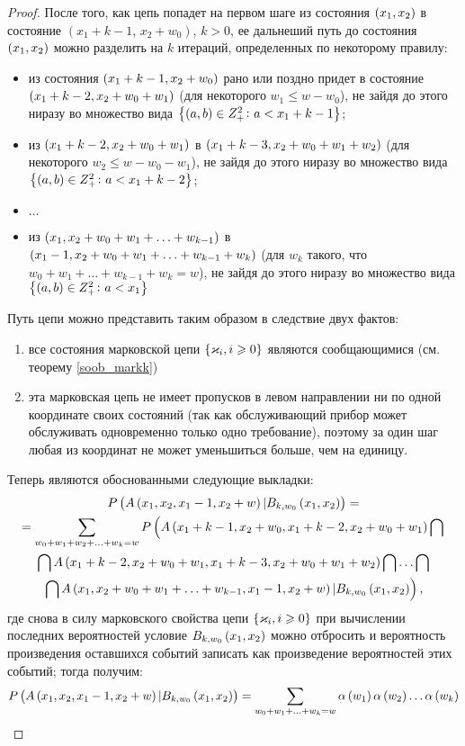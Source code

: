 \documentclass[a4paper,14pt,russian]{article}
\newcommand{\Markk}[0]{\brrr{ \vk_i, i \geqslant 0}}
\begin{document}
\begin{proof}
После того, как цепь попадет на первом шаге из состояния $\left(x_1,x_2\right)$  в состояние
$\left( x_1 + k - 1\right.$, $\left. x_2 + w_0\right)$, $k > 0$, ее дальнеший путь до состояния $\left(x_1,x_2\right)$ можно разделить на 
$k$ итераций, определенных по некоторому правилу: 
\begin{itemize}
 \item из состояния $\left(x_1 + k -1,x_2 + w_0\right)$ рано или поздно придет в состояние $\left(x_1+ k -2,x_2 + w_0 + w_1\right)$ (для некоторого
 $w_1 \leqslant w - w_0$), не зайдя до этого ниразу во множество вида 
$\left\{(a,b)\in Z_+^2  \colon a < x_1+ k - 1\right\}$; 
 \item из $\left(x_1+ k -2,x_2 + w_0 + w_1\right)$ в $\left(x_1+ k - 3,x_2 + w_0 + w_1 + w_2\right)$ (для некоторого $w_2 \leqslant w - w_0-w_1$), не зайдя до этого ниразу во множество вида $\left\{(a,b) \in Z_+^2  \colon a < x_1+ k -2\right\}$;
 \item $\ldots$
 \item из $\left(x_1,x_2 + w_0 + w_1 + \ldots + w_{k - 1}\right)$ в $\left(x_1 - 1,x_2 + w_0 + w_1 + \ldots + w_{k - 1} + w_k\right)$
 (для $w_k$ такого, что $w_0 + w_1 + \ldots + w_{k - 1} + w_k = w$), 
 не зайдя до этого ниразу во множество вида $\left\{(a,b) \in Z_+^2  \colon a < x_1 \right\}$
 \end{itemize}
 
Путь цепи можно представить таким образом в следствие двух фактов: 
\begin{enumerate}
\item все состояния марковской цепи $\Markk$ являются сообщающимися (см. теорему \ref{soob_markk}) 
\item эта марковская цепь не имеет пропусков в левом направлении
ни по одной координате своих состояний (так как обслуживающий прибор может обслуживать одновременно только одно требование), поэтому 
за один шаг любая из координат не может уменьшиться больше, чем на единицу. 
\end{enumerate}
Теперь являются обоснованными следующие выкладки:
  \begin{multline*}
P\left(A\left(x_1,x_2,x_1-1,x_2+w\right)|B_{k,w_0}\left(x_1,x_2\right)\right) =\\= \sum_{w_0 + w_1+w_2 +\ldots + w_k = w} 
P\left(A\left(x_1+k -1,x_2 + w_0,x_1 + k -2,x_2+w_0 + w_1\right) \bigcap \right. \\ \bigcap
A\left(x_1+k -2,x_2 + w_0 + w_1,x_1 + k -3,x_2+w_0 + w_1 + w_2\right)\bigcap \ldots \bigcap \\ \left.  \bigcap 
A\left(x_1,x_2 + w_0 + w_1 + \ldots + w_{k-1},x_1 - 1,x_2+w\right)|B_{k,w_0}\left(x_1,x_2\right)\right),
 \end{multline*}
где снова в силу марковского свойства цепи $\Markk$ при вычислении последних вероятностей условие $B_{k,w_0}\left(x_1,x_2\right)$ можно отбросить
и вероятность произведения оставшихся событий записать как произведение вероятностей этих событий; тогда получим:
\begin{equation}
 P\left(A\left(x_1,x_2,x_1-1,x_2+w\right)|B_{k,w_0}\left(x_1,x_2\right)\right) = \sum_{w_0 + w_1 + \ldots + w_k = w} \alpha\left(w_1\right)
 \alpha\left(w_2\right) \ldots \alpha\left(w_k\right)
 \label{addition_prob_four}
 \end{equation}
 

\end{proof}
\end{document}
